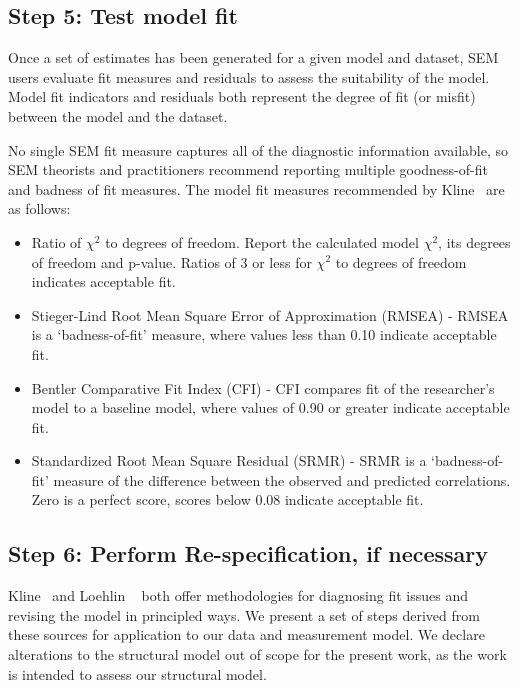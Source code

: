 \subsection{Step 5: Test model fit}
Once a set of estimates has been generated for a given model and dataset, SEM users evaluate fit measures and residuals to assess the suitability of the model. Model fit indicators and residuals both represent the degree of fit (or misfit) between the model and the dataset. 

No single SEM fit measure captures all of the diagnostic information available, so SEM theorists and practitioners recommend reporting multiple goodness-of-fit and badness of fit measures.
The model fit measures recommended by Kline~\cite{kline2015principles} are as follows:
\begin{itemize}
	\item Ratio of $\chi^2$ to degrees of freedom. Report the calculated model $\chi^2$, its degrees of freedom and p-value. Ratios of 3 or less for $\chi^2$ to degrees of freedom indicates acceptable fit.
	\item Stieger-Lind Root Mean Square Error of Approximation (RMSEA) - RMSEA is a `badness-of-fit' measure, where values less than 0.10 indicate acceptable fit.
	\item Bentler Comparative Fit Index (CFI) - CFI compares fit of the researcher's model to a baseline model, where values of 0.90 or greater indicate acceptable fit.
	\item Standardized Root Mean Square Residual (SRMR) - SRMR is a `badness-of-fit' measure of the difference between the observed and predicted correlations. Zero is a perfect score, scores below 0.08 indicate acceptable fit.
\end{itemize}

\subsection{Step 6: Perform Re-specification, if necessary}
Kline~\cite{kline2015principles} and Loehlin ~\cite{loehlin2004principles} both offer methodologies for diagnosing fit issues and revising the model in principled ways. We present a set of steps derived from these sources for application to our data and measurement model. We declare alterations to the structural model out of scope for the present work, as the work is intended to assess our structural model. 

